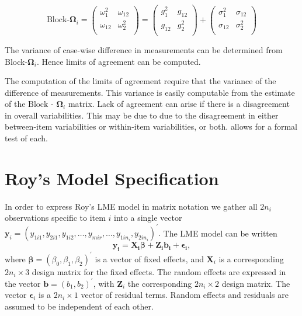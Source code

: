 \documentclass[12pt, a4paper]{report}
\theoremstyle{plain}
\theoremstyle{definition}
\theoremstyle{remark}
\begin{document}
\[ \textrm{Block-}\boldsymbol{\Omega}_{i}  = \left(\begin{array}{cc}
\omega^2_1  & \omega_{12} \\
\omega_{12} & \omega^2_2 \\
\end{array}  \right)
=  \left(
\begin{array}{cc}
g^2_1  & g_{12} \\
g_{12} & g^2_2 \\
\end{array} \right)+
\left(
\begin{array}{cc}
\sigma^2_1  & \sigma_{12} \\
\sigma_{12} & \sigma^2_2 \\
\end{array}\right)
\]

The variance of case-wise difference in measurements can be determined from Block-$\boldsymbol{\Omega}_{i}$. Hence limits of agreement can be computed.


The computation of the limits of agreement require that the variance of the difference of measurements. This variance is easily computable from the estimate of the ${\mbox{Block - }\boldsymbol \Omega_{i}}$ matrix. Lack of agreement can arise if there is a disagreement in overall variabilities. This may be due to due to the disagreement in either between-item
variabilities or within-item variabilities, or both. \citet{ARoy2009} allows for a formal test of each.
\newpage



\newpage\section{Roy's Model Specification}

	

In order to express Roy's LME model in matrix notation we gather all $2n_i$ observations specific to item $i$ into a single vector $\boldsymbol{y}_{i} = (y_{1i1},y_{2i1},y_{1i2},\ldots,y_{mir},\ldots,y_{1in_{i}},y_{2in_{i}})^\prime.$ The LME model can be written
\[
\boldsymbol{y_{i}} = \boldsymbol{X_{i}\beta} + \boldsymbol{Z_{i}b_{i}} + \boldsymbol{\epsilon_{i}},
\]
where $\boldsymbol{\beta}=(\beta_0,\beta_1,\beta_2)^\prime$ is a vector of fixed effects, and $\boldsymbol{X}_i$ is a corresponding $2n_i\times 3$ design matrix for the fixed effects. The random effects are expressed in the vector $\boldsymbol{b}=(b_1,b_2)^\prime$, with $\boldsymbol{Z}_i$ the corresponding $2n_i\times 2$ design matrix. The vector $\boldsymbol{\epsilon}_i$ is a $2n_i\times 1$ vector of residual terms. Random effects and residuals are assumed to be independent of each other.
\end{document}
